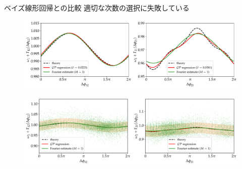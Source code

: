 \begin{frame}{ベイズ線形回帰との比較}
  適切な次数の選択に失敗している
  \begin{figure}
    \centering
    \includegraphics[width=\textwidth]{figs/vdp.pdf}
  \end{figure}
  \begin{figure}
    \centering
    \includegraphics[width=\textwidth]{code/vdp_20221121/fig20221121/exp01case01_errorbar.pdf}
  \end{figure}
\end{frame}